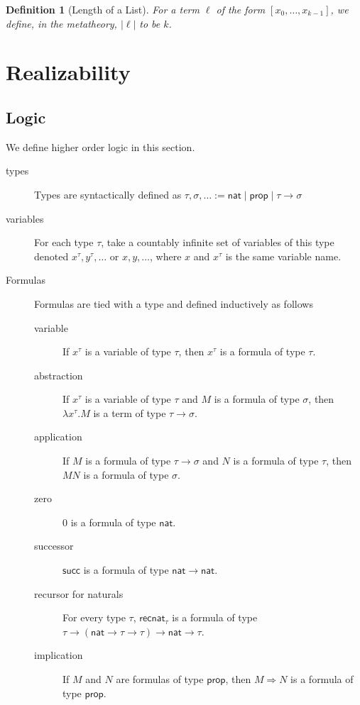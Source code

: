 \documentclass{article}
\newcommand{\successor}{\mathsf{succ}}
\newcommand{\nat}{\mathsf{nat}}
\newcommand{\prop}{\mathsf{prop}}
\newcommand{\recnat}[1]{\mathsf{recnat}_{#1}}
\newcommand{\length}[1]{{|#1|}}
\newtheorem{definition}{Definition}
\begin{document}
\begin{definition}[Length of a List]
    For a term $\ell$ of the form $[x_0, \dots, x_{k-1}]$, we define, in the metatheory, $\length{\ell}$ to be $k$.
\end{definition}

\section{Realizability}

\subsection{Logic}

We define higher order logic in this section.

\begin{description}
    \item[types] Types are syntactically defined as $\tau, \sigma, \dots := \nat \mid \prop \mid \tau \rightarrow \sigma$
    \item[variables] For each type $\tau$, take a countably infinite set of variables of this type denoted $x^\tau, y^\tau, \dots$ or $x, y, \dots$, where $x$ and $x^\tau$ is the same variable name.
    \item[Formulas] Formulas are tied with a type and defined inductively as follows
    \begin{description}
        \item[variable] If $x^\tau$ is a variable of type $\tau$, then $x^\tau$ is a formula of type $\tau$.
        \item[abstraction] If $x^\tau$ is a variable of type $\tau$ and $M$ is a formula of type $\sigma$, then $\lambda x^\tau. M$ is a term of type $\tau \rightarrow \sigma$.
        \item[application] If $M$ is a formula of type $\tau \rightarrow \sigma$ and $N$ is a formula of type $\tau$, then $MN$ is a formula of type $\sigma$.
        \item[zero] $0$ is a formula of type $\nat$.
        \item[successor] $\successor$ is a formula of type $\nat \rightarrow \nat$.
        \item[recursor for naturals] For every type $\tau$, $\recnat\tau$ is a formula of type $\tau \rightarrow (\nat \rightarrow \tau \rightarrow \tau) \rightarrow \nat \rightarrow \tau$.
        \item[implication] If $M$ and $N$ are formulas of type $\prop$, then $M \Rightarrow N$ is a formula of type $\prop$.

\end{description}
\end{description}
\end{document}
